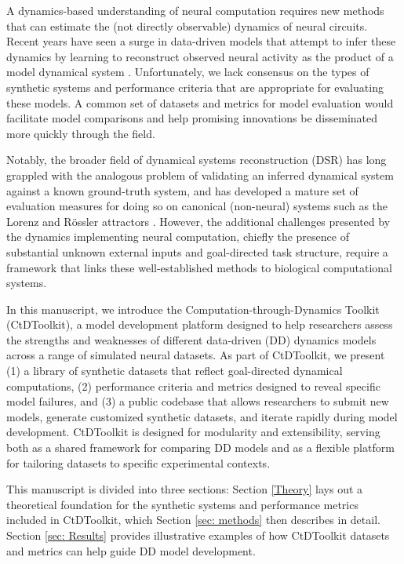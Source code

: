 \documentclass{article}
\begin{document}
A dynamics-based understanding of neural computation requires new methods that can estimate the (not directly observable) dynamics of neural circuits. Recent years have seen a surge in data-driven models that attempt to infer these dynamics by learning to reconstruct observed neural activity as the product of a model dynamical system \cite{gao_linear_2016, zhao2017variational, linderman2017bayesian, pandarinath_inferring_2018, schimel_ilqr-vae_2021, zoltowski2020general, smith_reverse_2021, versteeg2023expressive}. Unfortunately, we lack consensus on the types of synthetic systems and performance criteria that are appropriate for evaluating these models.
A common set of datasets and metrics for model evaluation would facilitate model comparisons and help promising innovations be disseminated more quickly through the field.

Notably, the broader field of dynamical systems reconstruction (DSR) has long grappled with the analogous problem of validating an inferred dynamical system against a known ground-truth system, and has developed a mature set of evaluation measures for doing so on canonical (non-neural) systems such as the Lorenz and R\"ossler attractors \cite{durstewitz2023reconstructing, pmlr-v162-brenner22a, mikhaeil2022difficulty}. However, the additional challenges presented by the dynamics implementing neural computation, chiefly the presence of substantial unknown external inputs and goal-directed task structure, require a framework that links these well-established methods to biological computational systems.

In this manuscript, we introduce the Computation-through-Dynamics Toolkit (CtDToolkit), a model development platform designed to help researchers assess the strengths and weaknesses of different data-driven (DD) dynamics models across a range of simulated neural datasets. As part of CtDToolkit, we present (1) a library of synthetic datasets that reflect goal-directed dynamical computations, (2) performance criteria and metrics designed to reveal specific model failures, and (3) a public codebase that allows researchers to submit new models, generate customized synthetic datasets, and iterate rapidly during model development. CtDToolkit is designed for modularity and extensibility, serving both as a shared framework for comparing DD models and as a flexible platform for tailoring datasets to specific experimental contexts.

This manuscript is divided into three sections: Section \ref{Theory} lays out a theoretical foundation for the synthetic systems and performance metrics included in CtDToolkit, which Section \ref{sec: methods} then describes in detail. Section \ref{sec: Results} provides illustrative examples of how CtDToolkit datasets and metrics can help guide DD model development.
\end{document}
